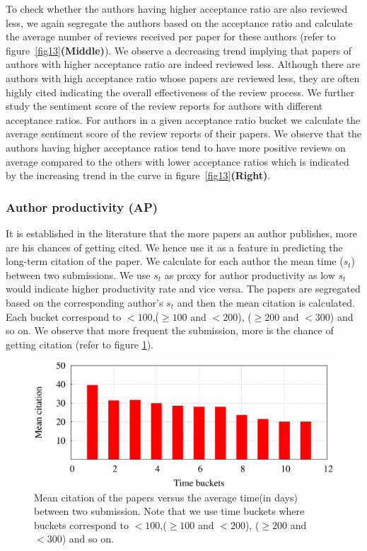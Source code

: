 \fi
To check whether the authors having higher acceptance ratio are also reviewed less, we again segregate the authors based on the acceptance ratio and calculate the average number of reviews received per paper for these authors (refer to figure~\ref{fig13}{\bf (Middle)}). We observe a decreasing trend implying that papers of authors with higher acceptance ratio are indeed reviewed less. Although there are authors with high acceptance ratio whose papers are reviewed less, they are often highly cited indicating the overall effectiveness of the review process. We further study the sentiment score of the review reports for authors with different acceptance ratios. For authors in a given  acceptance ratio bucket we calculate the average sentiment score of the review reports of their papers.
We observe that the authors having higher acceptance ratios tend to have more positive reviews on average compared to the others with lower acceptance ratios which is indicated by the increasing trend in the curve in figure~\ref{fig13}{\bf (Right)}. 

\subsubsection*{Author productivity (AP)} It is established in the literature \cite{yan2012better} that the more papers an author publishes, more are his chances of getting cited. We hence use it as a feature in predicting the long-term citation of the paper. We calculate for each author the mean time ($s_t$) between two submissions. We use $s_t$ as proxy for author productivity as low $s_t$ would indicate higher productivity rate and vice versa.  
The papers are segregated based on the corresponding author's $s_t$ and then the mean citation is calculated. Each bucket correspond to $<100$,($\geq 100$ and $< 200$), ($\geq 200$ and $<300$) and so on. We observe that more frequent the submission, more is the chance of getting citation (refer to figure \ref{fig:prod}).

\begin{figure}
\centering
\includegraphics[scale=0.25]{./texfiles/Chapter_4/jcdl/figures/prod_citation.eps}
\caption{Mean citation of the papers versus the average time(in days) between two submission. Note that  we use time buckets where buckets correspond to $<100$,($\geq 100$ and $< 200$), ($\geq 200$ and $<300$) and so on.\vspace{4mm}}
\label{fig:prod}
\end{figure}

